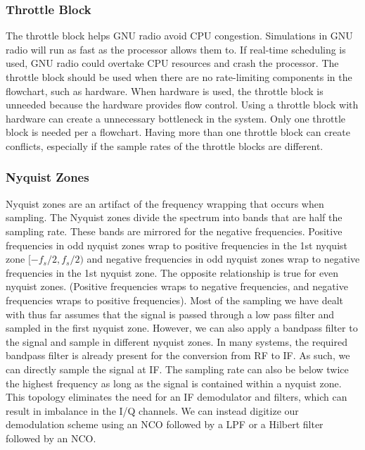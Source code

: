 \documentclass{article}
\begin{document}

	\subsubsection{Throttle Block}
	The throttle block helps GNU radio avoid CPU congestion. Simulations in GNU radio will run as fast as the processor allows them to. If real-time scheduling is used, GNU radio could overtake CPU resources and crash the processor. The throttle block should be used when there are no rate-limiting components in the flowchart, such as hardware. When hardware is used, the throttle block is unneeded because the hardware provides flow control. Using a throttle block with hardware can create a unnecessary bottleneck in the system. Only one throttle block is needed per a flowchart. Having more than one throttle block can create conflicts, especially if the sample rates of the throttle blocks are different.
		
		
	
	\subsubsection{Nyquist Zones}
	Nyquist zones are an artifact of the frequency wrapping that occurs when sampling. The Nyquist zones divide the spectrum into bands that are half the sampling rate. These bands are mirrored for the negative frequencies. Positive frequencies in odd nyquist zones wrap to positive frequencies in the 1st nyquist zone $[-f_s/2, f_s/2)$ and negative frequencies in odd nyquist zones wrap to negative frequencies in the 1st nyquist zone. The opposite relationship is true for even nyquist zones. (Positive frequencies wraps to negative frequencies, and negative frequencies wraps to positive frequencies). Most of the sampling we have dealt with thus far assumes that the signal is passed through a low pass filter and sampled in the first nyquist zone. However, we can also apply a bandpass filter to the signal and sample in different nyquist zones. In many systems, the required bandpass filter is already present for the conversion from RF to IF. As such, we can directly sample the signal at IF. The sampling rate can also be below twice the highest frequency as long as the signal is contained within a nyquist zone. This topology eliminates the need for an IF demodulator and filters, which can result in imbalance in the I/Q channels. We can instead digitize our demodulation scheme using an NCO followed by a LPF or a Hilbert filter followed by an NCO.
	
\end{document}
